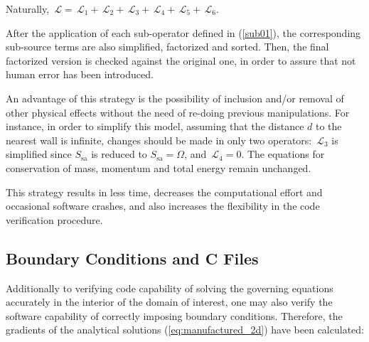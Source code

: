 \documentclass[10pt]{article}
\newcommand{\Lo}{\,\mathcal{L}}
\newcommand{\tsa}{\mathrm{sa}}
\begin{document}
Naturally, $\Lo=\Lo_1+\Lo_2+\Lo_3+\Lo_4+\Lo_5+\Lo_6.$


 After the application of each sub-operator defined in (\ref{sub01}), the corresponding sub-source terms are also simplified, factorized and sorted. Then, the final factorized version is checked against the original one, in order to assure that not human error has been introduced.

An advantage of this strategy is the possibility of inclusion and/or removal of other physical effects without the need of re-doing previous manipulations. For instance, in order to simplify this model, assuming that the distance $d$ to the nearest wall is infinite, changes should be made in only two operators:  $\Lo_3$ is simplified since $S_\tsa$ is reduced to $S_\tsa=\Omega$, and $\Lo_4=0$. The equations for conservation  of mass, momentum and total energy remain unchanged.


This strategy results in less time, decreases the computational effort and occasional software crashes, and also increases the flexibility in the code verification procedure.



\subsection{Boundary Conditions and C Files}
Additionally to verifying code capability of solving the governing equations accurately in the interior of the domain of interest, one may also verify the software capability of correctly imposing boundary conditions. Therefore, the gradients of the  analytical solutions (\ref{eq:manufactured_2d}) have been calculated:
\end{document}
